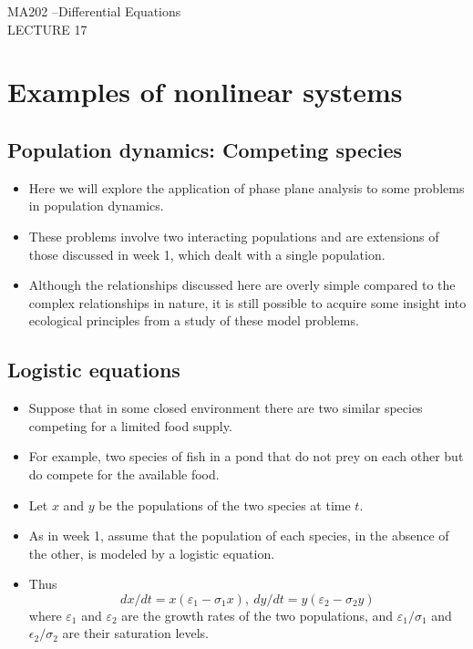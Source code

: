\documentclass[11pt,a4paper]{article}
\begin{document}
	\begin{center}
		\vspace*{8cm}
		\Huge MA202 –Differential Equations\\
		\LARGE LECTURE 17
  \end{center}
  \newpage
	\section*{Examples of nonlinear systems}
	\subsection*{Population dynamics: Competing species}
	\begin{itemize}
		\item Here we will explore the application of phase plane analysis to some problems in population dynamics.
		\item These problems involve two interacting populations and are extensions of those discussed in week 1, which dealt with a single population.
		\item Although the relationships discussed here are overly simple compared to the complex relationships in nature, it is still possible to acquire some insight into ecological principles from a study of these model problems.
	\end{itemize}
	\subsection*{Logistic equations}
	\begin{itemize}
		\item Suppose that in some closed environment there are two similar species competing for a limited food supply.
		\item For example, two species of fish in a pond that do not prey on each other but do compete for the available food.
		\item Let $x$ and $y$ be the populations of the two species at time $t$.
		\item As in week 1, assume that the population of each species, in the absence of the other, is modeled by a logistic equation.
		\item Thus
		$$
		dx/dt = x(\varepsilon_1 - \sigma_1x),\ dy/dt = y(\varepsilon_2 - \sigma_2y)
		$$
		where $\varepsilon_1$ and $\varepsilon_2$ are the growth rates of the two populations, and $\varepsilon_1/\sigma_1$ and $\epsilon_2/\sigma_2$ are their saturation levels.
	\end{itemize}
\end{document}
